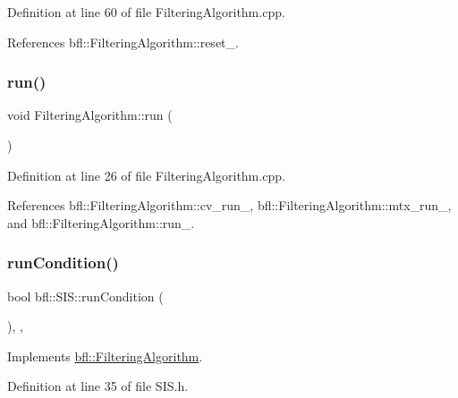 Definition at line 60 of file Filtering\+Algorithm.\+cpp.



References bfl\+::\+Filtering\+Algorithm\+::reset\+\_\+.

\mbox{\label{classbfl_1_1FilteringAlgorithm_a009cbe5f4bbb16967f6c6ddcaed8fbb1}} 
\subsubsection{\texorpdfstring{run()}{run()}}
{\footnotesize\ttfamily void Filtering\+Algorithm\+::run (\begin{DoxyParamCaption}{ }\end{DoxyParamCaption})\hspace{0.3cm}{\ttfamily [inherited]}}



Definition at line 26 of file Filtering\+Algorithm.\+cpp.



References bfl\+::\+Filtering\+Algorithm\+::cv\+\_\+run\+\_\+, bfl\+::\+Filtering\+Algorithm\+::mtx\+\_\+run\+\_\+, and bfl\+::\+Filtering\+Algorithm\+::run\+\_\+.

\mbox{\label{classbfl_1_1SIS_afb7cff1f7dae80e0e4ca84c925ca3ac3}} 
\subsubsection{\texorpdfstring{run\+Condition()}{runCondition()}}
{\footnotesize\ttfamily bool bfl\+::\+S\+I\+S\+::run\+Condition (\begin{DoxyParamCaption}{ }\end{DoxyParamCaption})\hspace{0.3cm}{\ttfamily [inline]}, {\ttfamily [override]}, {\ttfamily [virtual]}}



Implements \mbox{\hyperlink{classbfl_1_1FilteringAlgorithm_a5fc12882356f6906b102fbfff2bc4b7c}{bfl\+::\+Filtering\+Algorithm}}.



Definition at line 35 of file S\+I\+S.\+h.

\mbox{\label{classbfl_1_1ParticleFilter_a3d2935addf4481325a3fe8b99fe4d07a}} 
